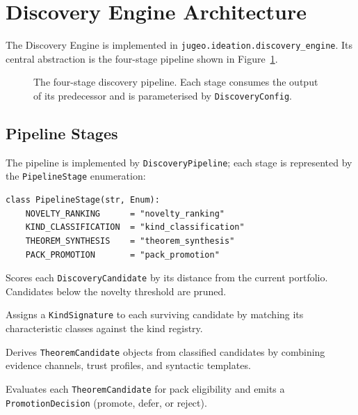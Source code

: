 \documentclass[11pt]{article}
\begin{document}
\section{Discovery Engine Architecture}\label{sec:architecture}

The Discovery Engine is implemented in
\texttt{jugeo.ideation.discovery\_engine}.  Its central abstraction
is the four-stage pipeline shown in Figure~\ref{fig:pipeline}.

\begin{figure}[h]
\centering
{}
\caption{The four-stage discovery pipeline.  Each stage consumes the
  output of its predecessor and is parameterised by \texttt{DiscoveryConfig}.}
\label{fig:pipeline}
\end{figure}

\subsection{Pipeline Stages}

The pipeline is implemented by \texttt{DiscoveryPipeline}; each stage
is represented by the \texttt{PipelineStage} enumeration:

\begin{lstlisting}[style=jugeo-python, caption={Pipeline stage enumeration.}]
class PipelineStage(str, Enum):
    NOVELTY_RANKING      = "novelty_ranking"
    KIND_CLASSIFICATION  = "kind_classification"
    THEOREM_SYNTHESIS    = "theorem_synthesis"
    PACK_PROMOTION       = "pack_promotion"
\end{lstlisting}

\begin{description}[leftmargin=0pt]
  \item[\texttt{NOVELTY\_RANKING}.]  Scores each \texttt{DiscoveryCandidate}
    by its distance from the current portfolio.  Candidates below the
    novelty threshold are pruned.

  \item[\texttt{KIND\_CLASSIFICATION}.]  Assigns a \texttt{KindSignature}
    to each surviving candidate by matching its characteristic classes
    against the kind registry.

  \item[\texttt{THEOREM\_SYNTHESIS}.]  Derives \texttt{TheoremCandidate}
    objects from classified candidates by combining evidence channels,
    trust profiles, and syntactic templates.

  \item[\texttt{PACK\_PROMOTION}.]  Evaluates each \texttt{TheoremCandidate}
    for pack eligibility and emits a \texttt{PromotionDecision}
    (promote, defer, or reject).
\end{description}
\end{document}
